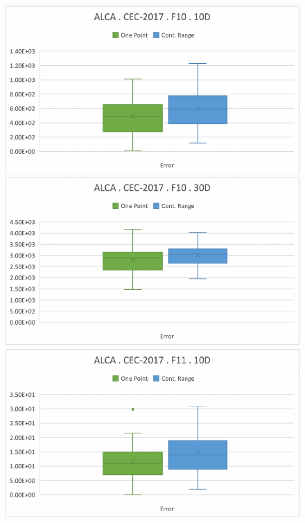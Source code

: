 \documentclass[graybox]{svmult}
\begin{document}
\begin{figure}[!ht]
\begin{minipage}[h]{0.49\linewidth}
            \includegraphics[width=1\linewidth]{img/fig_experiment_F10x10D.pdf} 
        \end{minipage}
        \hfill
        \begin{minipage}[h]{0.49\linewidth}
            \includegraphics[width=1\linewidth]{img/fig_experiment_F10x30D.pdf} 
        \end{minipage}
        \vfill
        \vspace{0.05 cm}
        \begin{minipage}[h]{0.49\linewidth}
            \includegraphics[width=1\linewidth]{img/fig_experiment_F11x10D.pdf} 

\end{minipage}
\end{figure}
\end{document}
